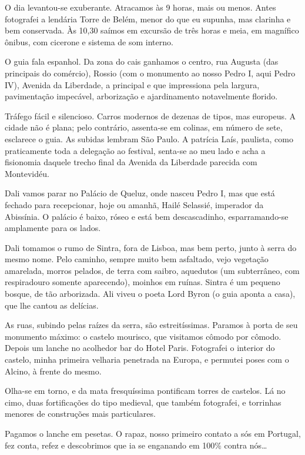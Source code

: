 O dia levantou-se exuberante. Atracamos às 9 horas, mais ou menos. Antes fotografei a lendária Torre de Belém, menor do que eu supunha, mas clarinha e bem conservada. Às 10,30 saímos em excursão de três horas e meia, em magnífico ônibus, com cicerone e sistema de som interno.

O guia fala espanhol. Da zona do cais ganhamos o centro, rua Augusta (das principais do comércio), Rossio (com o monumento ao nosso Pedro I, aqui Pedro IV), Avenida da Liberdade, a principal e que impressiona pela largura, pavimentação impecável, arborização e ajardinamento notavelmente florido.

Tráfego fácil e silencioso. Carros modernos de dezenas de tipos, mas europeus. A cidade não é plana; pelo contrário, assenta-se em colinas, em número de sete, esclarece o guia. As subidas lembram São Paulo. A patrícia Laís, paulista, como praticamente toda a delegação ao festival, senta-se ao meu lado e acha a fisionomia daquele trecho final da Avenida da Liberdade parecida com Montevidéu.

Dali vamos parar no Palácio de Queluz, onde nasceu Pedro I, mas que está fechado para recepcionar, hoje ou amanhã, Hailé Selassié, imperador da Abissínia. O palácio é baixo, róseo e está bem descascadinho, esparramando-se amplamente para os lados.

Dali tomamos o rumo de Sintra, fora de Lisboa, mas bem perto, junto à serra do mesmo nome. Pelo caminho, sempre muito bem asfaltado, vejo vegetação amarelada, morros pelados, de terra com saibro, aquedutos (um subterrâneo, com respiradouro somente aparecendo), moinhos em ruínas. Sintra é um pequeno bosque, de tão arborizada. Ali viveu o poeta Lord Byron (o guia aponta a casa), que lhe cantou as delícias.

As ruas, subindo pelas raízes da serra, são estreitíssimas. Paramos à porta de seu monumento máximo: o castelo mourisco, que visitamos cômodo por cômodo. Depois um lanche no acolhedor bar do Hotel Paris. Fotografei o interior do castelo, minha primeira velharia penetrada na Europa, e permutei poses com o Alcino, à frente do mesmo.

Olha-se em torno, e da mata fresquíssima pontificam torres de castelos. Lá no cimo, duas fortificações do tipo medieval, que também fotografei, e torrinhas menores de construções mais particulares.

Pagamos o lanche em pesetas. O rapaz, nosso primeiro contato a sós em Portugal, fez conta, refez e descobrimos que ia se enganando em 100\% contra nós\ldots

